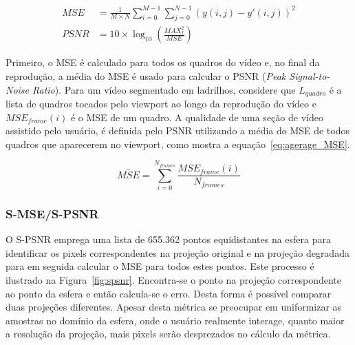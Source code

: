 \begin{align}
    \label{MSE}
    MSE&= \frac{1}{M\times N}\sum^{M-1}_{i=0}\sum^{N-1}_{j=0} \left(y(i,j) - y'(i,j)\right)^2 \\
    \label{PSNR}
    PSNR&=10 \times \log_{10}\left(\frac{MAX^2_I}{MSE}\right)
\end{align}

Primeiro, o MSE é calculado para todos os quadros do vídeo e, no final da reprodução, a média do MSE é usado para calcular o PSNR (\textit{Peak Signal-to-Noise Ratio}). Para um vídeo segmentado em ladrilhos, considere que $L_{quadro} $ é a lista de quadros tocados pelo viewport ao longo da reprodução do vídeo e $MSE_{frame}(i)$ é o MSE de um quadro. A qualidade de uma seção de vídeo assistido pelo usuário, é definida pelo PSNR utilizando a média do MSE de todos quadros que aparecerem no viewport, como mostra a equação~\ref{eq:agerage_MSE}.

\begin{equation}
    \bar{MSE} = \sum^{N_{frames}}_{i=0} \dfrac{MSE_{frame}(i)}{N_{frames}}
    \label{eq:agerage_MSE}
\end{equation}

\subsubsection{S-MSE/S-PSNR}

O S-PSNR emprega uma lista de 655.362 pontos equidistantes na esfera para identificar os pixels correspondentes na projeção original e na projeção degradada para em seguida calcular o MSE para todos estes pontos. Este processo é ilustrado na Figura~\ref{fig:spsnr}. Encontra-se o ponto na projeção correspondente ao ponto da esfera e então calcula-se o erro. Desta forma é possível comparar duas projeções diferentes. Apesar desta métrica se preocupar em uniformizar as amostras no domínio da esfera, onde o usuário realmente interage, quanto maior a resolução da projeção, mais pixels serão desprezados no cálculo da métrica.

